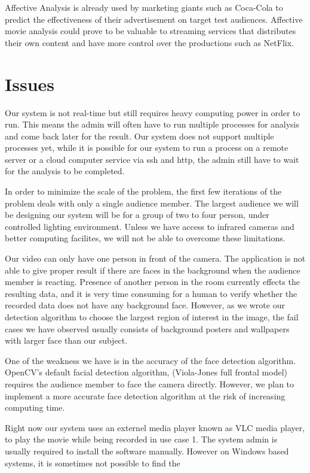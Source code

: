 \documentclass[12pt,a4paper,man]{report}
\begin{document}
Affective Analysis is already used by marketing giants such as Coca-Cola to predict the effectiveness of their advertisement on target test audiences. Affective movie analysis could prove to be valuable to streaming services that distributes their own content and have more control over the productions such as NetFlix.

\chapter{Issues}
\label{sec:org644a7be}
Our system is not real-time but still requires heavy computing power in order to run. This means the admin will often have to run multiple processes for analysis and come back later for the result. Our system does not support multiple processes yet, while it is possible for our system to run a process on a remote server or a cloud computer service via ssh and http, the admin still have to wait for the analysis to be completed. 

In order to minimize the scale of the problem, the first few iterations of the problem deals with only a single audience member. The largest audience we will be designing our system will be for a group of two to four person, under controlled lighting environment. Unless we have access to infrared cameras and better computing facilites, we will not be able to overcome these limitations. 

Our video can only have one person in front of the camera. The application is not able to give proper result if there are faces in the background when the audience member is reacting. Presence of another person in the room currently effects the resulting data, and it is very time consuming for a human to verify whether the recorded data does not have any background face. However, as we wrote our detection algorithm to choose the largest region of interest in the image, the fail cases we have observed usually consists of background posters and wallpapers with larger face than our subject.

One of the weakness we have is in the accuracy of the face detection algorithm. OpenCV's default facial detection algorithm, (Viola-Jones full frontal model) requires the audience member to face the camera directly. However, we plan to implement a more accurate face detection algorithm at the risk of increasing computing time.

Right now our system uses an externel media player known as VLC media player, to play the movie while being recorded in use case 1. The system admin is usually required to install the software manually. However on Windows based systems, it is sometimes not possible to find the 
\end{document}
